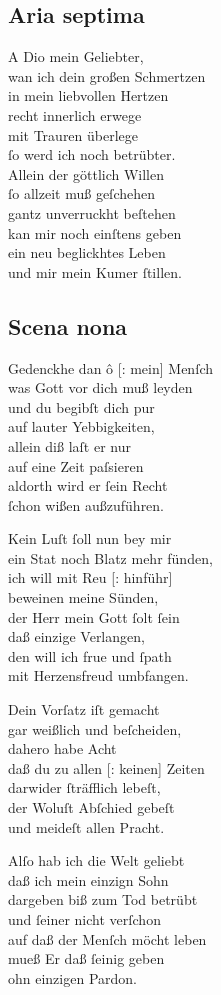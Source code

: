 \documentclass{ees}
\newenvironment{lyrics}[1]{%
  \subsection{#1}\nopagebreak%
  \begin{lyricslist}%
  \let\voice\item%
}{%
  \end{lyricslist}%
}
\begin{document}
\begin{lyrics}{Aria septima}
  \voice[Barmh.]
  A Dio mein Geliebter,\\
  wan ich dein großen Schmertzen\\
  in mein liebvollen Hertzen\\
  recht innerlich erwege\\
  mit Trauren überlege\\
  ſo werd ich noch betrübter.\\[1ex]
  Allein der göttlich Willen\\
  ſo allzeit muß geſchehen\\
  gantz unverruckht beſtehen\\
  kan mir noch einſtens geben\\
  ein neu beglickhtes Leben\\
  und mir mein Kumer ſtillen.
\end{lyrics}

\begin{lyrics}{Scena nona}
  \voice[Gerecht.]
  Gedenckhe dan ô [: mein] Menſch\\
  was Gott vor dich muß leyden\\
  und du begibſt dich pur\\
  auf lauter Yebbigkeiten,\\
  allein diß laſt er nur\\
  auf eine Zeit paſsieren\\
  aldorth wird er ſein Recht\\
  ſchon wißen außzuführen.

  \voice[Adam]
  Kein Luſt ſoll nun bey mir\\
  ein Stat noch Blatz mehr fünden,\\
  ich will mit Reu [: hinführ]\\
  beweinen meine Sünden,\\
  der Herr mein Gott ſolt ſein\\
  daß einzige Verlangen,\\
  den will ich frue und ſpath\\
  mit Herzensfreud umbfangen.

  \voice[Barmh.]
  Dein Vorſatz iſt gemacht\\
  gar weißlich und beſcheiden,\\
  dahero habe Acht\\
  daß du zu allen [: keinen] Zeiten\\
  darwider ſträfflich lebeſt,\\
  der Woluſt Abſchied gebeſt\\
  und meideſt allen Pracht.

  \voice[Schöpffer]
  Alſo hab ich die Welt geliebt\\
  daß ich mein einzign Sohn\\
  dargeben biß zum Tod betrübt\\
  und ſeiner nicht verſchon\\
  auf daß der Menſch möcht leben\\
  mueß Er daß ſeinig geben\\
  ohn einzigen Pardon.
\end{lyrics}
\end{document}
